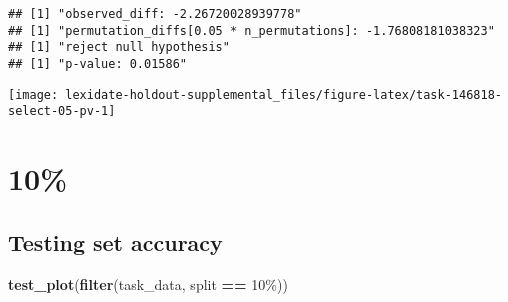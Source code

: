 \documentclass[
]{book}
\newenvironment{Shaded}{\begin{snugshade}}{\end{snugshade}}
\newcommand{\AttributeTok}[1]{\textcolor[rgb]{0.13,0.29,0.53}{#1}}
\newcommand{\DecValTok}[1]{\textcolor[rgb]{0.00,0.00,0.81}{#1}}
\newcommand{\FunctionTok}[1]{\textcolor[rgb]{0.13,0.29,0.53}{\textbf{#1}}}
\newcommand{\NormalTok}[1]{#1}
\newcommand{\OtherTok}[1]{\textcolor[rgb]{0.56,0.35,0.01}{#1}}
\newcommand{\SpecialCharTok}[1]{\textcolor[rgb]{0.81,0.36,0.00}{\textbf{#1}}}
\newcommand{\StringTok}[1]{\textcolor[rgb]{0.31,0.60,0.02}{#1}}
\begin{document}
\begin{Shaded}
\end{Shaded}

\begin{verbatim}
## [1] "observed_diff: -2.26720028939778"
## [1] "permutation_diffs[0.05 * n_permutations]: -1.76808181038323"
## [1] "reject null hypothesis"
## [1] "p-value: 0.01586"
\end{verbatim}

\texttt{[image: lexidate-holdout-supplemental\_files/figure-latex/task-146818-select-05-pv-1]}

\hypertarget{section-1}{%
\section{10\%}\label{section-1}}

\hypertarget{testing-set-accuracy-1}{%
\subsection{Testing set accuracy}\label{testing-set-accuracy-1}}

\begin{Shaded}
\begin{Highlighting}[]
\FunctionTok{test\_plot}\NormalTok{(}\FunctionTok{filter}\NormalTok{(task\_data, split }\SpecialCharTok{==} \StringTok{\textquotesingle{}10\%\textquotesingle{}}\NormalTok{))}
\end{Highlighting}
\end{Shaded}
\end{document}
